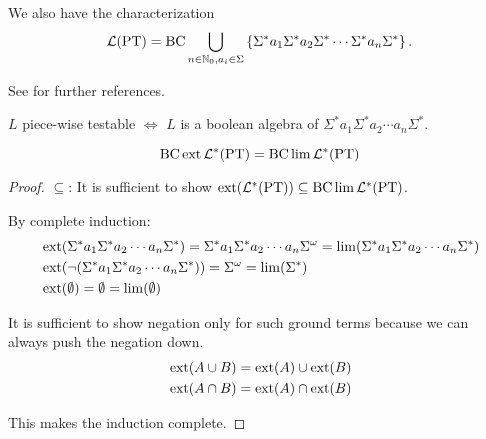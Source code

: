 We also have the characterization
\[ \Lang(\PT) = \BC \bigcup_{n\in\N_0,a_i \in \Sigma} \Set{\Sigma^* a_1 \Sigma^* a_2 \Sigma^* \cdots\Sigma^* a_n \Sigma^*} . \]

See \cite[Section 2.3]{ConcHierR104} for further references.


$L$ piece-wise testable $\Leftrightarrow$ $L$ is a boolean algebra of $\Sigma^* a_1 \Sigma^* a_2 \dotsb a_n \Sigma^*$.

\begin{theorem}
\label{thm.PT}
\[ \operatorname{BC} \operatorname{ext} \mathcal{L}^* (\textup{\textrm{PT}}) = \operatorname{BC} \lim \mathcal{L}^* (\textup{\textrm{PT}}) \]
\begin{proof}
$\subseteq$: It is sufficient to show $\operatorname{ext}(\mathcal{L}^* (\textup{\textrm{PT}})) \subseteq \operatorname{BC} \lim \mathcal{L}^* (\textup{\textrm{PT}})$.

By complete induction:
\begin{align*}
& \operatorname{ext}(\Sigma^* a_1 \Sigma^* a_2 \dotsb a_n \Sigma^*) = \Sigma^* a_1 \Sigma^* a_2 \dotsb a_n \Sigma^\omega = \lim(\Sigma^* a_1 \Sigma^* a_2 \dotsb a_n \Sigma^*) \\
& \operatorname{ext}( \neg ( \Sigma^* a_1 \Sigma^* a_2 \dotsb a_n \Sigma^* )) = \Sigma^\omega = \lim( \Sigma^* ) \\
& \operatorname{ext}( \emptyset ) = \emptyset = \lim(\emptyset)
\end{align*}

It is sufficient to show negation only for such ground terms because we can always push the negation down.
\begin{align*}
& \operatorname{ext}(A \cup B) = \operatorname{ext}(A) \cup \operatorname{ext}(B) \\
& \operatorname{ext}(A \cap B) = \operatorname{ext}(A) \cap \operatorname{ext}(B)
\end{align*}

This makes the induction complete.


\end{proof}
\end{theorem}
